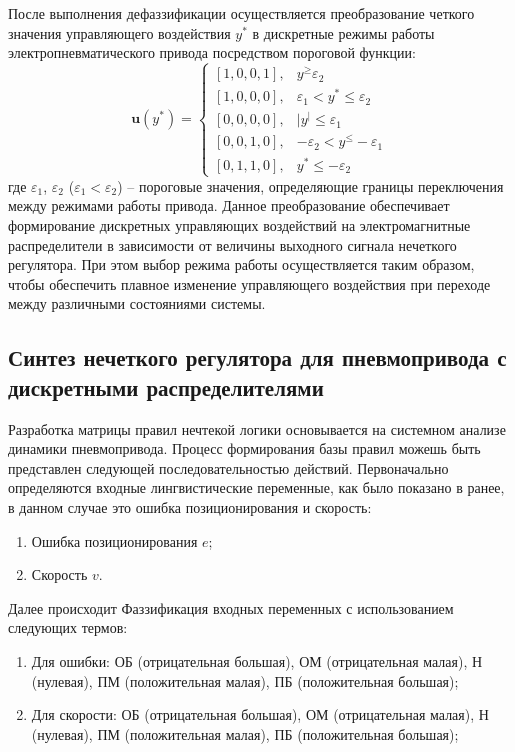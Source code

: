 После выполнения дефаззификации осуществляется преобразование четкого значения управляющего воздействия
$y^*$ в дискретные режимы работы электропневматического привода посредством пороговой функции:
\begin{equation*}
	\mathbf{u}(y^*) = \begin{cases}
		[1,0,0,1], & y^ \geq \varepsilon_2                   \\
		[1,0,0,0], & \varepsilon_1 < y^* \leq \varepsilon_2  \\
		[0,0,0,0], & |y^| \leq \varepsilon_1                 \\
		[0,0,1,0], & -\varepsilon_2 < y^ \leq -\varepsilon_1 \\
		[0,1,1,0], & y^* \leq -\varepsilon_2
	\end{cases}
\end{equation*}
где $\varepsilon_1$, $\varepsilon_2$ ($\varepsilon_1 < \varepsilon_2$) -- пороговые значения, определяющие
границы переключения между режимами работы привода.
Данное преобразование обеспечивает формирование дискретных
управляющих воздействий на электромагнитные распределители в зависимости от
величины выходного сигнала нечеткого регулятора. При этом выбор
режима работы осуществляется таким образом, чтобы обеспечить плавное
изменение управляющего воздействия при переходе между различными состояниями системы.


\subsection{Синтез нечеткого регулятора для пневмопривода с дискретными распределителями}\label{subsec:ch3/sec4/sub2}

Разработка матрицы правил нечтекой логики основывается на системном
анализе динамики пневмопривода. Процесс формирования базы правил можешь быть представлен
следующей последовательностью действий.
Первоначально определяются входные лингвистические переменные, как было показано в ранее, в данном случае это ошибка позиционирования и скорость:
\begin{enumerate}
	\item Ошибка позиционирования $e$;
	\item Скорость $v$.
\end{enumerate}

Далее происходит Фаззификация входных переменных с использованием следующих термов:
\begin{enumerate}
	\item Для ошибки: {ОБ (отрицательная большая),
	      ОМ (отрицательная малая),
	      Н (нулевая),
	      ПМ (положительная малая),
	      ПБ (положительная большая)};

	\item Для скорости: {ОБ (отрицательная большая),
	      ОМ (отрицательная малая),
	      Н (нулевая),
	      ПМ (положительная малая),
	      ПБ (положительная большая)};
\end{enumerate}

